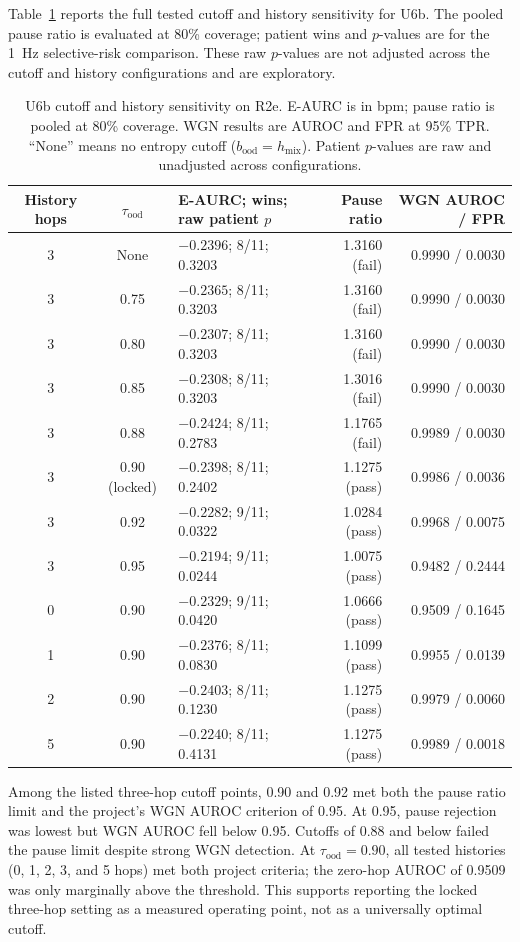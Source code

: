 Table~\ref{tab:ch5_u6b_sensitivity} reports the full tested cutoff and history sensitivity for U6b. The pooled pause ratio is evaluated at 80\% coverage; patient wins and $p$-values are for the 1~Hz selective-risk comparison. These raw $p$-values are not adjusted across the cutoff and history configurations and are exploratory.

\begin{table}[htbp]
\centering
\footnotesize
\caption{U6b cutoff and history sensitivity on R2e. E-AURC is in bpm; pause ratio is pooled at 80\% coverage. WGN results are AUROC and FPR at 95\% TPR. ``None'' means no entropy cutoff ($b_{\mathrm{ood}}=h_{\mathrm{mix}}$). Patient $p$-values are raw and unadjusted across configurations.}
\label{tab:ch5_u6b_sensitivity}
\begin{tabularx}{\textwidth}{@{}cc>{\raggedright\arraybackslash}Xrr@{}}
\toprule
History hops & $\tau_{\mathrm{ood}}$ & E-AURC; wins; raw patient $p$ & Pause ratio & WGN AUROC / FPR \\
\midrule
3 & None & $-0.2396$; 8/11; 0.3203 & 1.3160 (fail) & 0.9990 / 0.0030 \\
3 & 0.75 & $-0.2365$; 8/11; 0.3203 & 1.3160 (fail) & 0.9990 / 0.0030 \\
3 & 0.80 & $-0.2307$; 8/11; 0.3203 & 1.3160 (fail) & 0.9990 / 0.0030 \\
3 & 0.85 & $-0.2308$; 8/11; 0.3203 & 1.3016 (fail) & 0.9990 / 0.0030 \\
3 & 0.88 & $-0.2424$; 8/11; 0.2783 & 1.1765 (fail) & 0.9989 / 0.0030 \\
3 & 0.90 (locked) & $-0.2398$; 8/11; 0.2402 & 1.1275 (pass) & 0.9986 / 0.0036 \\
3 & 0.92 & $-0.2282$; 9/11; 0.0322 & 1.0284 (pass) & 0.9968 / 0.0075 \\
3 & 0.95 & $-0.2194$; 9/11; 0.0244 & 1.0075 (pass) & 0.9482 / 0.2444 \\
0 & 0.90 & $-0.2329$; 9/11; 0.0420 & 1.0666 (pass) & 0.9509 / 0.1645 \\
1 & 0.90 & $-0.2376$; 8/11; 0.0830 & 1.1099 (pass) & 0.9955 / 0.0139 \\
2 & 0.90 & $-0.2403$; 8/11; 0.1230 & 1.1275 (pass) & 0.9979 / 0.0060 \\
5 & 0.90 & $-0.2240$; 8/11; 0.4131 & 1.1275 (pass) & 0.9989 / 0.0018 \\
\bottomrule
\end{tabularx}
\end{table}

Among the listed three-hop cutoff points, 0.90 and 0.92 met both the pause ratio limit and the project's WGN AUROC criterion of 0.95. At 0.95, pause rejection was lowest but WGN AUROC fell below 0.95. Cutoffs of 0.88 and below failed the pause limit despite strong WGN detection. At $\tau_{\mathrm{ood}}=0.90$, all tested histories (0, 1, 2, 3, and 5 hops) met both project criteria; the zero-hop AUROC of 0.9509 was only marginally above the threshold. This supports reporting the locked three-hop setting as a measured operating point, not as a universally optimal cutoff.

